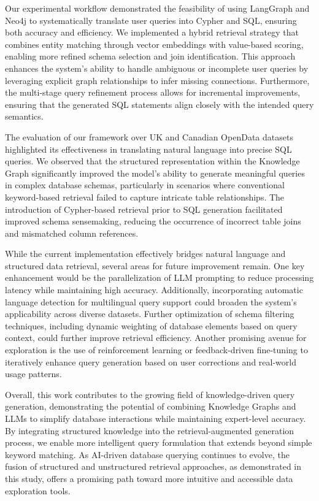 Our experimental workflow demonstrated the feasibility of using LangGraph and Neo4j to systematically translate user queries into Cypher and SQL, ensuring both accuracy and efficiency. We implemented a hybrid retrieval strategy that combines entity matching through vector embeddings with value-based scoring, enabling more refined schema selection and join identification. This approach enhances the system’s ability to handle ambiguous or incomplete user queries by leveraging explicit graph relationships to infer missing connections. Furthermore, the multi-stage query refinement process allows for incremental improvements, ensuring that the generated SQL statements align closely with the intended query semantics.  

The evaluation of our framework over UK and Canadian OpenData datasets highlighted its effectiveness in translating natural language into precise SQL queries. We observed that the structured representation within the Knowledge Graph significantly improved the model’s ability to generate meaningful queries in complex database schemas, particularly in scenarios where conventional keyword-based retrieval failed to capture intricate table relationships. The introduction of Cypher-based retrieval prior to SQL generation facilitated improved schema sensemaking, reducing the occurrence of incorrect table joins and mismatched column references.  

While the current implementation effectively bridges natural language and structured data retrieval, several areas for future improvement remain. One key enhancement would be the parallelization of LLM prompting to reduce processing latency while maintaining high accuracy. Additionally, incorporating automatic language detection for multilingual query support could broaden the system’s applicability across diverse datasets. Further optimization of schema filtering techniques, including dynamic weighting of database elements based on query context, could further improve retrieval efficiency. Another promising avenue for exploration is the use of reinforcement learning or feedback-driven fine-tuning to iteratively enhance query generation based on user corrections and real-world usage patterns.  

Overall, this work contributes to the growing field of knowledge-driven query generation, demonstrating the potential of combining Knowledge Graphs and LLMs to simplify database interactions while maintaining expert-level accuracy. By integrating structured knowledge into the retrieval-augmented generation process, we enable more intelligent query formulation that extends beyond simple keyword matching. As AI-driven database querying continues to evolve, the fusion of structured and unstructured retrieval approaches, as demonstrated in this study, offers a promising path toward more intuitive and accessible data exploration tools.